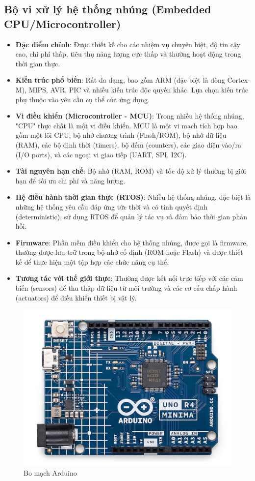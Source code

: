 \subsection{Bộ vi xử lý hệ thống nhúng (Embedded CPU/Microcontroller)}

\begin{itemize}
    \item \textbf{Đặc điểm chính}: Được thiết kế cho các nhiệm vụ chuyên biệt, độ tin cậy cao, chi phí thấp, tiêu thụ năng lượng cực thấp và thường hoạt động trong thời gian thực.
    
    \item \textbf{Kiến trúc phổ biến}: Rất đa dạng, bao gồm ARM (đặc biệt là dòng Cortex-M), MIPS, AVR, PIC và nhiều kiến trúc độc quyền khác. Lựa chọn kiến trúc phụ thuộc vào yêu cầu cụ thể của ứng dụng.
    
    \item \textbf{Vi điều khiển (Microcontroller - MCU)}: Trong nhiều hệ thống nhúng, "CPU" thực chất là một vi điều khiển. MCU là một vi mạch tích hợp bao gồm một lõi CPU, bộ nhớ chương trình (Flash/ROM), bộ nhớ dữ liệu (RAM), các bộ định thời (timers), bộ đếm (counters), các giao diện vào/ra (I/O ports), và các ngoại vi giao tiếp (UART, SPI, I2C).
    
    \item \textbf{Tài nguyên hạn chế}: Bộ nhớ (RAM, ROM) và tốc độ xử lý thường bị giới hạn để tối ưu chi phí và năng lượng.
    
    \item \textbf{Hệ điều hành thời gian thực (RTOS)}: Nhiều hệ thống nhúng, đặc biệt là những hệ thống yêu cầu đáp ứng tức thời và có tính quyết định (deterministic), sử dụng RTOS để quản lý tác vụ và đảm bảo thời gian phản hồi.
    
    \item \textbf{Firmware}: Phần mềm điều khiển cho hệ thống nhúng, được gọi là firmware, thường được lưu trữ trong bộ nhớ cố định (ROM hoặc Flash) và được thiết kế để thực hiện một tập hợp các chức năng cụ thể.
    
    \item \textbf{Tương tác với thế giới thực}: Thường được kết nối trực tiếp với các cảm biến (sensors) để thu thập dữ liệu từ môi trường và các cơ cấu chấp hành (actuators) để điều khiển thiết bị vật lý.
\end{itemize}

\begin{figure}[H]
    \centering
    \includegraphics[width=0.65\linewidth]{img/cpu_embedded.png}
    \caption{Bo mạch Arduino}
\end{figure}

